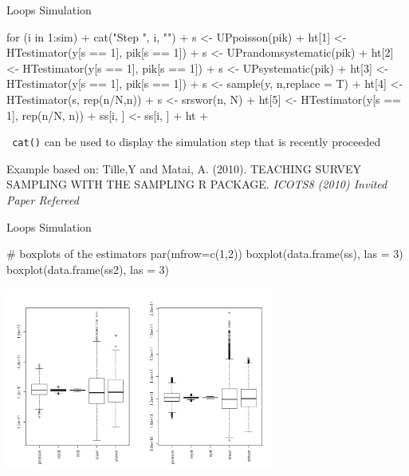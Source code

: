 \documentclass[11pt,german,hideothersubsections]{beamer}
\newcommand{\R}[1]{{\tt \color{blue}  #1}}
\begin{document}
\begin{frame}[fragile]{Loops} {Simulation}
\footnotesize{
\begin{Schunk}
\begin{Sinput}
 for (i in 1:sim) {
+     cat("Step ", i, "\n")
+     s <- UPpoisson(pik)
+     ht[1] <- HTestimator(y[s == 1], pik[s == 1])
+     s <- UPrandomsystematic(pik)
+     ht[2] <- HTestimator(y[s == 1], pik[s == 1])
+     s <- UPsystematic(pik)
+     ht[3] <- HTestimator(y[s == 1], pik[s == 1])
+     s <- sample(y, n,replace = T)
+     ht[4] <- HTestimator(s, rep(n/N,n))
+     s <- srswor(n, N)
+     ht[5] <- HTestimator(y[s == 1], rep(n/N, n))
+     ss[i, ] <- ss[i, ] + ht 
+   } 
\end{Sinput}
\end{Schunk}
}
\begin{itemize}\footnotesize{
\item \R{cat()} can be used to display the simulation step that is recently proceeded
}
\end{itemize}
\tiny{Example based on: Tille,Y and Matai, A. (2010). TEACHING SURVEY SAMPLING WITH THE SAMPLING R PACKAGE. \emph{ICOTS8 (2010) Invited Paper Refereed}}
\end{frame}
\begin{frame}[fragile]{Loops} {Simulation}
\footnotesize{
\begin{Schunk}
\begin{Sinput}
 # boxplots of the estimators
   par(mfrow=c(1,2))
   boxplot(data.frame(ss), las = 3) 
   boxplot(data.frame(ss2), las = 3)
\end{Sinput}
\end{Schunk}
}
\includegraphics[width=\textwidth, height=6cm]{../figure/Verteilungen.png}

\end{frame}
\end{document}
